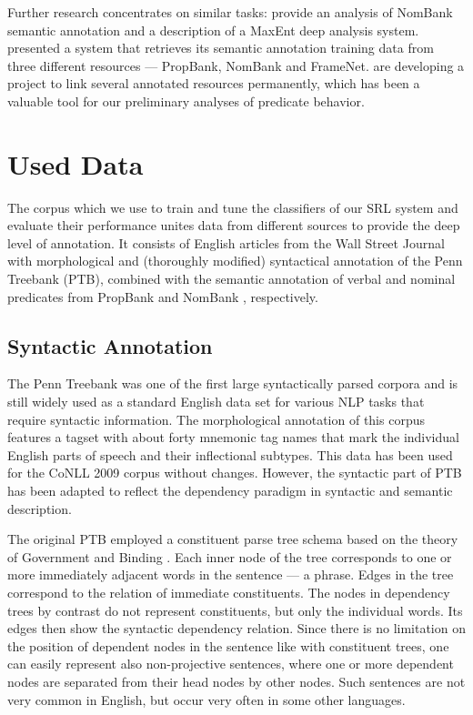 \documentclass[12pt,notitlepage]{report}
\begin{document}
Further research concentrates on similar tasks: \citet{jiang06} provide an analysis of NomBank \citep{meyers04} semantic annotation and a description of a MaxEnt deep analysis system. \citet{giuglea06} presented a system that retrieves its semantic annotation training data from three different resources --- PropBank, NomBank and FrameNet. \citet{loper07} are developing a project to link several annotated resources permanently, which has been a valuable tool for our preliminary analyses of predicate behavior. 

%
%
\chapter{Used Data}\label{data}
%
%

The corpus which we use to train and tune the classifiers of our SRL system and evaluate their performance \citep{surdeanu08,hajic09} unites data from different sources to provide the deep level of annotation. It consists of English articles from the Wall Street Journal with morphological and (thoroughly modified) syntactical annotation of the Penn Treebank (PTB), \citep{marcus93} combined with the semantic annotation of verbal and nominal predicates from PropBank \citep{palmer05} and NomBank \citep{meyers04}, respectively.

\section{Syntactic Annotation}

The Penn Treebank was one of the first large syntactically parsed corpora and is still widely used as a standard English data set for various NLP tasks that require syntactic information. The morphological annotation of this corpus features a tagset \citep{santorini90} with about forty mnemonic tag names that mark the individual English parts of speech and their inflectional subtypes. This data has been used for the CoNLL 2009 corpus without changes. However, the syntactic part of PTB has been adapted to reflect the dependency paradigm in syntactic and semantic description.

The original PTB employed a constituent parse tree schema based on the theory of Government and Binding \citep{chomsky81}. Each inner node of the tree corresponds to one or more immediately adjacent words in the sentence --- a phrase. Edges in the tree correspond to the relation of immediate constituents. The nodes in dependency trees by contrast do not represent constituents, but only the individual words. Its edges then show the syntactic dependency relation. Since there is no limitation on the position of dependent nodes in the sentence like with constituent trees, one can easily represent also non-projective sentences, where one or more dependent nodes are separated from their head nodes by other nodes. Such sentences are not very common in English, but occur very often in some other languages.
\end{document}
